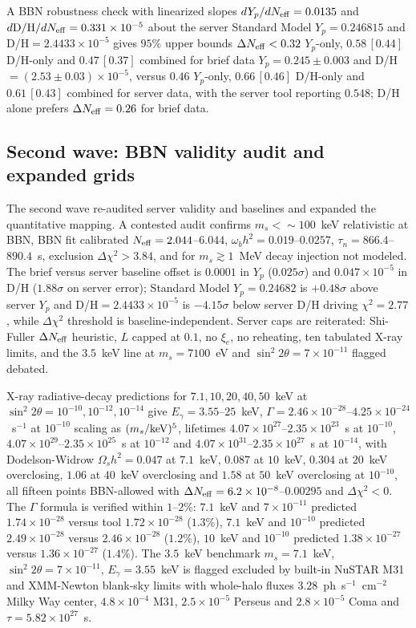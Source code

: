 \documentclass[11pt,a4paper]{article}
\begin{document}
A BBN robustness check with linearized slopes $dY_{p}/dN_{\rm eff}=0.0135$ and $d{\rm D/H}/dN_{\rm eff}=0.331\times10^{-5}$ about the server Standard Model $Y_{p}=0.246815$ and D/H$=2.4433\times10^{-5}$ gives $95\%$ upper bounds $\Delta N_{\rm eff}<0.32$ $Y_{p}$-only, $0.58\,[0.44]$ D/H-only and $0.47\,[0.37]$ combined for brief data $Y_{p}=0.245\pm0.003$ and D/H$=(2.53\pm0.03)\times10^{-5}$, versus $0.46$ $Y_{p}$-only, $0.66\,[0.46]$ D/H-only and $0.61\,[0.43]$ combined for server data, with the server tool reporting $0.548$; D/H alone prefers $\Delta N_{\rm eff}=0.26$ for brief data.

\subsection{Second wave: BBN validity audit and expanded grids}
The second wave re-audited server validity and baselines and expanded the quantitative mapping. A contested audit confirms $m_{s}<\sim100$~keV relativistic at BBN, BBN fit calibrated $N_{\rm eff}=2.044$--$6.044$, $\omega_{b}h^{2}=0.019$--$0.0257$, $\tau_{n}=866.4$--$890.4$~s, exclusion $\Delta\chi^{2}>3.84$, and for $m_{s}\gtrsim1$~MeV decay injection not modeled. The brief versus server baseline offset is $0.0001$ in $Y_{p}$ ($0.025\sigma$) and $0.047\times10^{-5}$ in D/H ($1.88\sigma$ on server error); Standard Model $Y_{p}=0.24682$ is $+0.48\sigma$ above server $Y_{p}$ and D/H$=2.4433\times10^{-5}$ is $-4.15\sigma$ below server D/H driving $\chi^{2}=2.77$, while $\Delta\chi^{2}$ threshold is baseline-independent. Server caps are reiterated: Shi-Fuller $\Delta N_{\rm eff}$ heuristic, $L$ capped at $0.1$, no $\xi_{e}$, no reheating, ten tabulated X-ray limits, and the $3.5$~keV line at $m_{s}=7100$~eV and $\sin^{2}2\theta=7\times10^{-11}$ flagged debated.

X-ray radiative-decay predictions for $7.1,10,20,40,50$~keV at $\sin^{2}2\theta=10^{-10},10^{-12},10^{-14}$ give $E_{\gamma}=3.55$--$25$~keV, $\Gamma=2.46\times10^{-28}$--$4.25\times10^{-24}$~s$^{-1}$ at $10^{-10}$ scaling as $(m_{s}/{\rm keV})^{5}$, lifetimes $4.07\times10^{27}$--$2.35\times10^{23}$~s at $10^{-10}$, $4.07\times10^{29}$--$2.35\times10^{25}$~s at $10^{-12}$ and $4.07\times10^{31}$--$2.35\times10^{27}$~s at $10^{-14}$, with Dodelson-Widrow $\Omega_{s}h^{2}=0.047$ at $7.1$~keV, $0.087$ at $10$~keV, $0.304$ at $20$~keV overclosing, $1.06$ at $40$~keV overclosing and $1.58$ at $50$~keV overclosing at $10^{-10}$, all fifteen points BBN-allowed with $\Delta N_{\rm eff}=6.2\times10^{-8}$--$0.00295$ and $\Delta\chi^{2}<0$. The $\Gamma$ formula is verified within $1$--$2\%$: $7.1$~keV and $7\times10^{-11}$ predicted $1.74\times10^{-28}$ versus tool $1.72\times10^{-28}$ ($1.3\%$), $7.1$~keV and $10^{-10}$ predicted $2.49\times10^{-28}$ versus $2.46\times10^{-28}$ ($1.2\%$), $10$~keV and $10^{-10}$ predicted $1.38\times10^{-27}$ versus $1.36\times10^{-27}$ ($1.4\%$). The $3.5$~keV benchmark $m_{s}=7.1$~keV, $\sin^{2}2\theta=7\times10^{-11}$, $E_{\gamma}=3.55$~keV is flagged excluded by built-in NuSTAR M31 and XMM-Newton blank-sky limits with whole-halo fluxes $3.28$~ph~s$^{-1}$~cm$^{-2}$ Milky Way center, $4.8\times10^{-4}$ M31, $2.5\times10^{-5}$ Perseus and $2.8\times10^{-5}$ Coma and $\tau=5.82\times10^{27}$~s.
\end{document}
